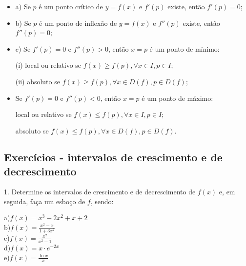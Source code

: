 \documentclass{article}
\begin{document}
{\begin{newpage}
\begin{itemize}
\item a) Se $p$ é um ponto crítico de $y=f(x)$ e $f'(p)$ existe, então $f'(p)=0$;
\item b) Se $p$ é um ponto de inflexão de $y=f(x)$ e $f''(p)$ existe, então $f''(p)=0$;
\item c) Se $f'(p) = 0$ e $f''(p)>0$, então $x=p$ é um ponto de mínimo:
\par
\hspace{12pt} (i) local ou relativo se $f(x)\geq f(p), \forall x\in I, p\in I$;
\par
\hspace{12pt} (ii) absoluto se $f(x)\geq f(p), \forall x\in D(f), p\in D(f)$;
\item Se $f'(p)=0$ e $f''(p)<0$, então $x=p$ é um ponto de máximo:
\par
\hspace{12pt} local ou relativo se $f(x)\leq f(p), \forall x\in I, p\in I$;
\par
\hspace{12pt} absoluto se $f(x)\leq f(p), \forall x\in D(f), p\in D(f)$.
\end{itemize}
\par
\vspace{0.3cm}
\subsection{Exercícios - intervalos de crescimento e de decrescimento}
\vspace{0.3cm}
\begin{flushleft}
1. Determine os intervalos de crescimento e de decrescimento de $f(x)$ e, em seguida, faça um esboço de $f$, sendo:
\end{flushleft}
\par
\begin{multicols}{2}
\hspace{-15pt}a)$f(x) = x^3 - 2x^2 + x + 2$\\
b)$f(x)=\displaystyle{\frac{x^2 - x}{1 + 3x^2}}$\\
c)$f(x)=\displaystyle{\frac{x^2}{x^2 - 1}}$\\
d)$f(x)=x\cdot e^{-2x}$\\
e)$f(x)=\displaystyle{\frac{\ln{x}}{x}}$\\
\end{multicols}
\par
\vspace{0.3cm}

\end{newpage}}
\end{document}
